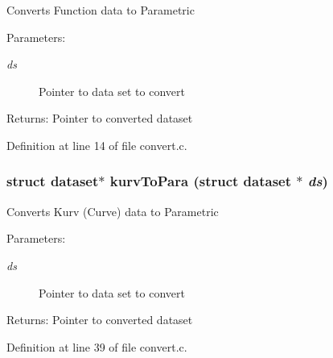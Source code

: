 Converts Function data to Parametric

\begin{Desc}
\item[Parameters:]
\begin{description}
\item[{\em ds}]Pointer to data set to convert \end{description}
\end{Desc}
\begin{Desc}
\item[Returns:]Pointer to converted dataset \end{Desc}


Definition at line 14 of file convert.c.
\subsubsection{\setlength{\rightskip}{0pt plus 5cm}struct {\bf dataset}$\ast$ kurv\-To\-Para (struct {\bf dataset} $\ast$ {\em ds})}\label{convert_8h_a2}


Converts Kurv (Curve) data to Parametric

\begin{Desc}
\item[Parameters:]
\begin{description}
\item[{\em ds}]Pointer to data set to convert \end{description}
\end{Desc}
\begin{Desc}
\item[Returns:]Pointer to converted dataset \end{Desc}


Definition at line 39 of file convert.c.